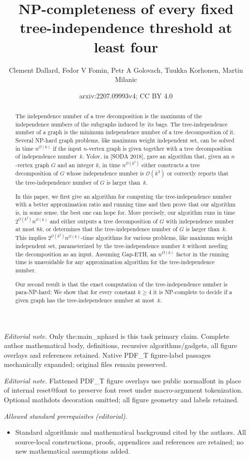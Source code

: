 \documentclass[11pt]{article}
\date{}
\title{NP-completeness of every fixed tree-independence threshold at least four}
\author{Clement Dallard, Fedor V Fomin, Petr A Golovach, Tuukka Korhonen, Martin Milanic}
\date{arxiv:2207.09993v4; CC BY 4.0}
\theoremstyle{definition}
\newcommand{\NP}{\textup{\textsf{NP}}}
\newcommand{\parNP}{\textup{\textsf{para-NP}}}
\newcommand{\OO}{\mathcal{O}}
\begin{document}
\maketitle
\noindent\textit{Editorial note.} Only the:main\_nphard is this task primary claim. Complete author mathematical body, definitions, recursive algorithms/gadgets, all figure overlays and references retained. Native PDF\_T figure-label passages mechanically expanded; original files remain preserved.\par\medskip
\noindent\textit{Editorial note.} Flattened PDF\_T figure overlays use public normalfont in place of internal reset@font to preserve font reset under macro-argument tokenization. Optional mathdots decoration omitted; all figure geometry and labels retained.\par\medskip
\noindent\textit{Allowed standard prerequisites (editorial).}\begin{itemize}
\item Standard algorithmic and mathematical background cited by the authors. All source-local constructions, proofs, appendices and references are retained; no new mathematical assumptions added.
\end{itemize}\medskip



\begin{abstract}
The independence number of a tree decomposition is the maximum of the independence numbers of the subgraphs induced by its bags.
The tree-independence number of a graph is the minimum independence number of a tree decomposition of it.
Several \NP-hard graph problems, like maximum weight independent set, can be solved in time $n^{\OO(k)}$ if the input $n$-vertex graph is given together with a tree decomposition of independence number~$k$.
Yolov, in [SODA 2018], gave an algorithm that, given an $n$-vertex graph $G$ and an integer $k$, in time
$n^{\OO(k^3)}$ either constructs a tree decomposition of $G$ whose independence number is $\OO(k^3)$ or correctly reports that
the tree-independence number of $G$ is larger than~$k$.


In this paper, we first give an algorithm for computing the tree-independence number with a better approximation ratio and running time and then prove that our algorithm is, in some sense, the best one can hope for.
More precisely, our algorithm runs in time $2^{\OO(k^2)} n^{\OO(k)}$ and either outputs a tree decomposition of $G$ with independence number at most $8k$, or determines that the tree-independence number of $G$ is larger than~$k$.
This implies $2^{\OO(k^2)} n^{\OO(k)}$-time algorithms for various problems, like maximum weight independent set, parameterized by the tree-independence number $k$ without needing the decomposition as an input.
Assuming Gap-ETH, an $n^{\Omega(k)}$ factor in the running time is unavoidable for any approximation algorithm for the tree-independence number.

Our second result is that the exact computation of the tree-independence number is \parNP-hard: We show that for every constant $k \ge 4$ it is \NP-complete to decide if a given graph has the tree-independence number at most~$k$.
\end{abstract}
\end{document}
